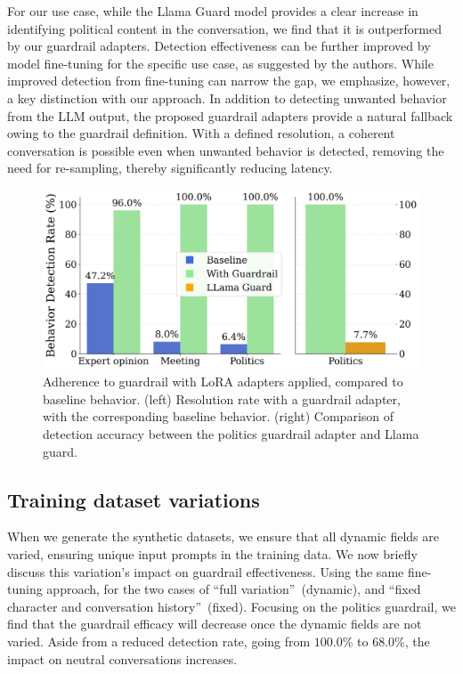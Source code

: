 \documentclass[letterpaper]{article}
\newcommand{\tagDetectionPoliticsFixed}{68.0}
\newcommand{\tagDetectionPolitics}{100.0}
\begin{document}
For our use case, while the Llama Guard model provides a clear increase in identifying political content in the conversation, we find that it is outperformed by our guardrail adapters.
Detection effectiveness can be further improved by model fine-tuning for the specific use case, as suggested by the authors. While improved detection from fine-tuning can narrow the gap, we emphasize, however, a key distinction with our approach. In addition to detecting unwanted behavior from the LLM output, the proposed guardrail adapters provide a natural fallback owing to the guardrail definition. With a defined resolution, a coherent conversation is possible even when unwanted behavior is detected, removing the need for re-sampling, thereby significantly reducing latency.

\begin{figure}[h!]
	\centering
	\includegraphics[width=1.0\linewidth]{figures/detection_efficiency_single.png}
	\caption{Adherence to guardrail with LoRA adapters applied, compared to baseline behavior. 
		(left)  Resolution rate with a guardrail adapter, with the corresponding baseline behavior. 
		(right)  Comparison of detection accuracy between the politics guardrail adapter and Llama guard.}\label{fig:llora-result}
\end{figure}
\subsection{Training dataset variations}
When we generate the synthetic datasets, we ensure that all dynamic fields are varied, ensuring unique input prompts in the training data. We now briefly discuss this variation's impact on guardrail effectiveness. 
Using the same fine-tuning approach, for the two cases of ``full variation''~(dynamic),  and ``fixed character and conversation history''~(fixed). 
Focusing on the politics guardrail, we find that the guardrail efficacy will decrease once the dynamic fields are not varied. Aside from a reduced detection rate, going from $\tagDetectionPolitics$\% to $\tagDetectionPoliticsFixed$\%, the impact on neutral conversations increases.
\end{document}
